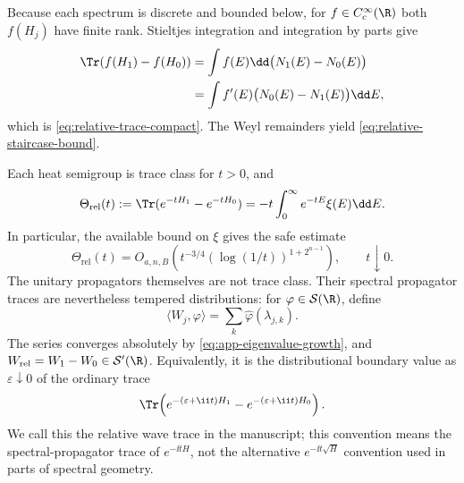 Because each spectrum is discrete and bounded below, for
\(f\in C_c^\infty(\R)\) both \(f(H_j)\) have finite rank.  Stieltjes
integration and integration by parts give
\begin{align}
 \Tr(f(H_1)-f(H_0))
 &=\int f(E)\dd\bigl(N_1(E)-N_0(E)\bigr)\\
 &=\int f'(E)\bigl(N_0(E)-N_1(E)\bigr)\dd E,
\end{align}
which is \cref{eq:relative-trace-compact}.  The Weyl remainders yield
\cref{eq:relative-staircase-bound}.

Each heat semigroup is trace class for \(t>0\), and
\begin{equation}
 \Theta_{\mathrm{rel}}(t)
 :=\Tr(e^{-tH_1}-e^{-tH_0})
 =-t\int_0^\infty e^{-tE}\xi(E)\dd E.
 \label{eq:app-relative-heat}
\end{equation}
In particular, the available bound on \(\xi\) gives the safe estimate
\begin{equation}
 \Theta_{\mathrm{rel}}(t)
 =O_{a,n,B}\!\left(
 t^{-3/4}(\log(1/t))^{1+2^{n-1}}\right),
 \qquad t\downarrow0.
 \label{eq:app-relative-heat-bound}
\end{equation}
The unitary propagators themselves are not trace class.  Their spectral
propagator traces are nevertheless tempered distributions: for
\(\varphi\in\mathcal S(\R)\), define
\begin{equation}
 \langle W_j,\varphi\rangle
 =\sum_k\widehat\varphi(\lambda_{j,k}).
 \label{eq:app-wave-distribution}
\end{equation}
The series converges absolutely by
\cref{eq:app-eigenvalue-growth}, and
\(W_{\mathrm{rel}}=W_1-W_0\in\mathcal S'(\R)\).  Equivalently, it is the
distributional boundary value as \(\varepsilon\downarrow0\) of the ordinary
trace
\begin{equation}
 \Tr\!\left(e^{-(\varepsilon+\ii t)H_1}
             -e^{-(\varepsilon+\ii t)H_0}\right).
 \label{eq:app-damped-wave}
\end{equation}
We call this the relative wave trace in the manuscript; this convention means
the spectral-propagator trace of \(e^{-\ii tH}\), not the alternative
\(e^{-\ii t\sqrt H}\) convention used in parts of spectral geometry.

